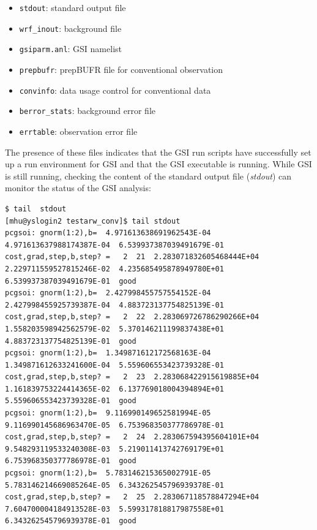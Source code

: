 \begin{itemize}
\item \verb|stdout|:		standard output file
\item \verb|wrf_inout|:  	background file
\item \verb|gsiparm.anl|:   	GSI namelist
\item \verb|prepbufr|:  	prepBUFR file for conventional observation
\item \verb|convinfo|: 		data usage control for conventional data
\item \verb|berror_stats|: 	background error file
\item \verb|errtable|: 		observation error file
\end{itemize}

The presence of these files indicates that the GSI run scripts have successfully set up a run environment for GSI and that the GSI executable is running.  While GSI is still running, checking the content of the standard output file (\textit{stdout}) can monitor the status of the GSI analysis:

\begin{tiny}
\begin{verbatim}
$ tail  stdout
[mhu@yslogin2 testarw_conv]$ tail stdout
pcgsoi: gnorm(1:2),b=  4.971613638691962543E-04  4.971613637988174387E-04  6.539937387039491679E-01
cost,grad,step,b,step? =   2  21  2.283071832605468444E+04  2.229711559527815246E-02  4.235685495878949780E+01  6.539937387039491679E-01  good 
pcgsoi: gnorm(1:2),b=  2.427998455757554152E-04  2.427998455925739387E-04  4.883723137754825139E-01
cost,grad,step,b,step? =   2  22  2.283069726786290266E+04  1.558203598942562579E-02  5.370146211199837438E+01  4.883723137754825139E-01  good 
pcgsoi: gnorm(1:2),b=  1.349871612172568163E-04  1.349871612633241600E-04  5.559606553423739328E-01
cost,grad,step,b,step? =   2  23  2.283068422915619885E+04  1.161839753224414365E-02  6.137769018004394894E+01  5.559606553423739328E-01  good 
pcgsoi: gnorm(1:2),b=  9.116990149652581994E-05  9.116990145686963470E-05  6.753968350377786978E-01
cost,grad,step,b,step? =   2  24  2.283067594395604101E+04  9.548293119533240308E-03  5.219011413742769179E+01  6.753968350377786978E-01  good 
pcgsoi: gnorm(1:2),b=  5.783146215365002791E-05  5.783146214669085264E-05  6.343262545796939378E-01
cost,grad,step,b,step? =   2  25  2.283067118578847294E+04  7.604700004184913528E-03  5.599317818817987558E+01  6.343262545796939378E-01  good 
\end{verbatim}
\end{tiny}

